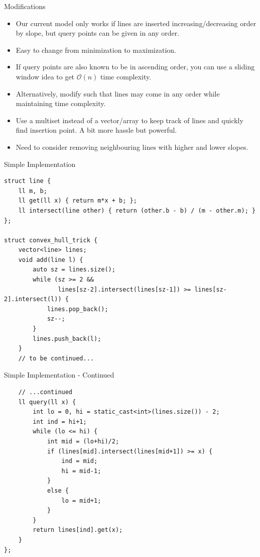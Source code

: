 \documentclass{beamer}
\begin{document}
\begin{frame}[plain]{Modifications}
    \begin{itemize}
        \item<1-> Our current model only works if lines are inserted increasing/decreasing order by slope, but query points can be given in any order.
        \item<2-> Easy to change from minimization to maximization.
        \item<3-> If query points are also known to be in ascending order, you can use a sliding window idea to get $\mathcal{O}(n)$ time complexity.
        \item<4-> Alternatively, modify such that lines may come in any order while maintaining time complexity.
        \item<5-> Use a multiset instead of a vector/array to keep track of lines and quickly find insertion point. A bit more hassle but powerful.
        \item<6-> Need to consider removing neighbouring lines with higher and lower slopes.
    \end{itemize}
\end{frame}

\begin{frame}{Simple Implementation}
    \begin{scriptsize}
        \begin{verbatim}
struct line {
    ll m, b;
    ll get(ll x) { return m*x + b; };
    ll intersect(line other) { return (other.b - b) / (m - other.m); }
};

struct convex_hull_trick {
    vector<line> lines;
    void add(line l) {
        auto sz = lines.size();
        while (sz >= 2 &&
               lines[sz-2].intersect(lines[sz-1]) >= lines[sz-2].intersect(l)) {
            lines.pop_back();
            sz--;
        }
        lines.push_back(l);
    }
    // to be continued...
        \end{verbatim}
    \end{scriptsize}
\end{frame}

\begin{frame}{Simple Implementation - Continued}
    \begin{scriptsize}
        \begin{verbatim}
    // ...continued
    ll query(ll x) {
        int lo = 0, hi = static_cast<int>(lines.size()) - 2;
        int ind = hi+1;
        while (lo <= hi) {
            int mid = (lo+hi)/2;
            if (lines[mid].intersect(lines[mid+1]) >= x) {
                ind = mid;
                hi = mid-1;
            }
            else {
                lo = mid+1;
            }
        }
        return lines[ind].get(x);
    }
};
        \end{verbatim}
    \end{scriptsize}
\end{frame}
\end{document}
